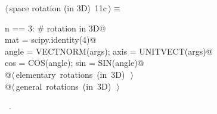 \documentclass[11pt,oneside]{article}	%
\begin{document}
\begin{flushleft} \small \label{scrap23}
\protect{}$\langle\,$space rotation (in 3D)\nobreak\ {\footnotesize 11c}$\,\rangle\equiv$
\vspace{-1ex}
\begin{list}{}{} \item
\mbox{}\verb@if n == 3: # rotation in 3D@\\
\mbox{}\verb@   mat = scipy.identity(4)@\\
\mbox{}\verb@   angle = VECTNORM(args); axis = UNITVECT(args)@\\
\mbox{}\verb@   cos = COS(angle); sin = SIN(angle)@\\
\mbox{}\verb@   @\hbox{$\langle\,$elementary rotations (in 3D)\nobreak\ {\footnotesize {}}$\,\rangle$}\verb@@\\
\mbox{}\verb@   @\hbox{$\langle\,$general rotations (in 3D)\nobreak\ {\footnotesize {}}$\,\rangle$}\verb@@\\
\mbox{}\verb@@{\NWsep}
\end{list}
\vspace{-1ex}
\footnotesize\addtolength{\baselineskip}{-1ex}
\begin{list}{}{\setlength{\itemsep}{-\parsep}\setlength{\itemindent}{-\leftmargin}}
\item \NWtxtMacroRefIn\ .
\end{list}
\end{flushleft}
\end{document}
